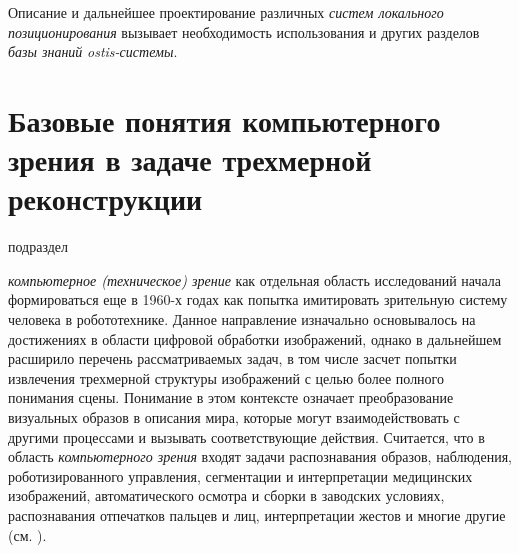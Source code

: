 Описание и дальнейшее проектирование различных \textit{систем локального позиционирования} вызывает необходимость использования и других разделов \textit{базы знаний} \textit{ostis-системы}. 

\section{Базовые понятия компьютерного зрения в задаче трехмерной реконструкции}
\label{sec_3d_models_computervision}
\begin{SCn}
	\begin{scnrelfromlist}{подраздел}
	\end{scnrelfromlist}
\end{SCn}

\textit{компьютерное (техническое) зрение} как отдельная область исследований начала формироваться еще в 1960-х годах как попытка имитировать зрительную систему человека в робототехнике. Данное направление изначально основывалось на достижениях в области цифровой обработки изображений, однако в дальнейшем расширило перечень рассматриваемых задач, в том числе засчет попытки извлечения трехмерной структуры изображений с целью более полного понимания сцены. Понимание в этом контексте означает преобразование визуальных образов в описания мира, которые могут взаимодействовать с другими процессами и вызывать соответствующие действия. Считается, что в область \textit{компьютерного зрения} входят задачи распознавания образов, наблюдения, роботизированного управления, сегментации и интерпретации медицинских изображений, автоматического осмотра и сборки в заводских условиях, распознавания отпечатков пальцев и лиц, интерпретации жестов и многие другие (см. ).

\begin{SCn}
\end{SCn}

